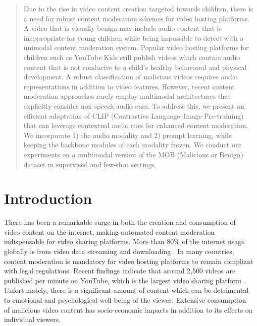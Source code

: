 \documentclass[letterpaper]{article}
\begin{document}
\begin{abstract}
Due to the rise in video content creation targeted towards children, there is a need for robust content moderation schemes for video hosting platforms. A video that is visually benign may include audio content that is inappropriate for young children while being impossible to detect with a unimodal content moderation system. Popular video hosting platforms for children such as YouTube Kids still publish videos which contain audio content that is not conducive to a child's healthy behavioral and physical development. A robust classification of malicious videos requires audio representations in addition to video features. However, recent content moderation approaches rarely employ multimodal architectures that explicitly consider non-speech audio cues. To address this, we present an efficient adaptation of CLIP (Contrastive Language–Image Pre-training) that can leverage contextual audio cues for enhanced content moderation. We incorporate 1) the audio modality and 2) prompt learning, while keeping the backbone modules of each modality frozen. We conduct our experiments on a multimodal version of the MOB (Malicious or Benign) dataset in supervised and few-shot settings. %
 
\end{abstract}


\section{Introduction}

There has been a remarkable surge in both the creation and consumption of video content on the internet, making automated content moderation indispensable for video sharing platforms. More than 80\% of the internet usage globally is from video data streaming and downloading \cite{Shewale_2024a}.  In many countries, content moderation is mandatory for video hosting platforms to remain compliant with legal regulations. 
Recent findings indicate that around 2,500 videos are published per minute on YouTube, which is the largest video sharing platform \cite{ytusagedaily}.  Unfortunately, there is a significant amount of content which can be detrimental to emotional and psychological well-being of the viewer. 
 Extensive consumption of malicious video content has socio-economic impacts in addition to its effects on individual viewers. 
\end{document}
